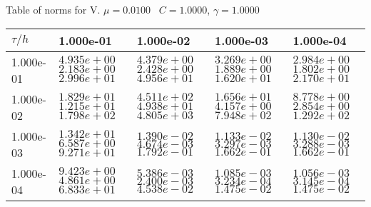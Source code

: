 \begin{center}
Table of norms for V. $\mu = 0.0100$ \, $C = 1.0000$, $\gamma = 1.0000$
  
\begin{tabular}{|p{1in}|p{1in}|p{1in}|p{1in}|p{1in}|} \hline
$\tau / h$ &1.000e-01 &1.000e-02 &1.000e-03 &1.000e-04 \\ \hline 
1.000e-01 & $4.935e+00$  $2.183e+00$  $2.996e+01$  & $4.379e+00$  $2.428e+00$  $4.956e+01$  & $3.269e+00$  $1.889e+00$  $1.620e+01$  & $2.984e+00$  $1.802e+00$  $2.170e+01$  \\ \hline 
1.000e-02 & $1.829e+01$  $1.215e+01$  $1.798e+02$  & $4.511e+02$  $4.938e+01$  $4.805e+03$  & $1.656e+01$  $4.157e+00$  $7.948e+02$  & $8.778e+00$  $2.854e+00$  $1.292e+02$  \\ \hline 
1.000e-03 & $1.342e+01$  $6.587e+00$  $9.271e+01$  & $1.390e-02$  $4.674e-03$  $1.792e-01$  & $1.133e-02$  $3.297e-03$  $1.662e-01$  & $1.130e-02$  $3.288e-03$  $1.662e-01$  \\ \hline 
1.000e-04 & $9.423e+00$  $4.861e+00$  $6.833e+01$  & $5.386e-03$  $2.400e-03$  $4.538e-02$  & $1.085e-03$  $3.234e-04$  $1.475e-02$  & $1.056e-03$  $3.145e-04$  $1.475e-02$  \\ \hline 

\end{tabular}\\[20pt]
\end{center}
